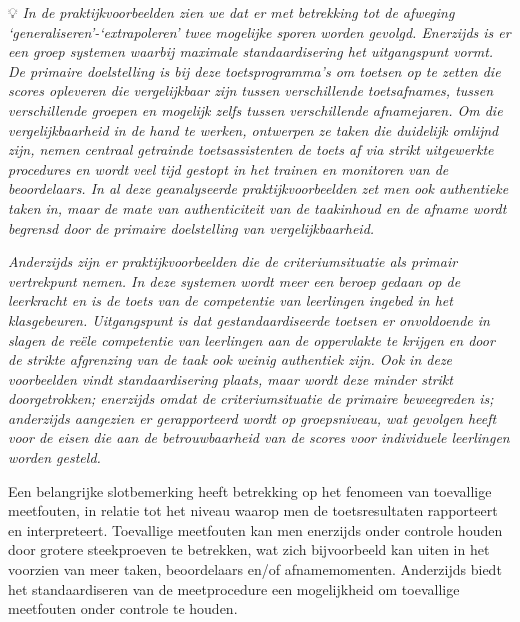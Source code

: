 \documentclass[
  letterpaper,
]{report}
\begin{document}
💡 \emph{In de praktijkvoorbeelden zien we dat er met betrekking tot de
afweging `generaliseren'-`extrapoleren' twee mogelijke sporen worden
gevolgd. Enerzijds is er een groep systemen waarbij maximale
standaardisering het uitgangspunt vormt. De primaire doelstelling is bij
deze toetsprogramma's om toetsen op te zetten die scores opleveren die
vergelijkbaar zijn tussen verschillende toetsafnames, tussen
verschillende groepen en mogelijk zelfs tussen verschillende
afnamejaren. Om die vergelijkbaarheid in de hand te werken, ontwerpen ze
taken die duidelijk omlijnd zijn, nemen centraal getrainde
toetsassistenten de toets af via strikt uitgewerkte procedures en wordt
veel tijd gestopt in het trainen en monitoren van de beoordelaars. In al
deze geanalyseerde praktijkvoorbeelden zet men ook authentieke taken in,
maar de mate van authenticiteit van de taakinhoud en de afname wordt
begrensd door de primaire doelstelling van vergelijkbaarheid.}

\emph{Anderzijds zijn er praktijkvoorbeelden die de criteriumsituatie
als primair vertrekpunt nemen. In deze systemen wordt meer een beroep
gedaan op de leerkracht en is de toets van de competentie van leerlingen
ingebed in het klasgebeuren. Uitgangspunt is dat gestandaardiseerde
toetsen er onvoldoende in slagen de reële competentie van leerlingen aan
de oppervlakte te krijgen en door de strikte afgrenzing van de taak ook
weinig authentiek zijn. Ook in deze voorbeelden vindt standaardisering
plaats, maar wordt deze minder strikt doorgetrokken; enerzijds omdat de
criteriumsituatie de primaire beweegreden is; anderzijds aangezien er
gerapporteerd wordt op groepsniveau, wat gevolgen heeft voor de eisen
die aan de betrouwbaarheid van de scores voor individuele leerlingen
worden gesteld.}

Een belangrijke slotbemerking heeft betrekking op het fenomeen van
toevallige meetfouten, in relatie tot het niveau waarop men de
toetsresultaten rapporteert en interpreteert. Toevallige meetfouten kan
men enerzijds onder controle houden door grotere steekproeven te
betrekken, wat zich bijvoorbeeld kan uiten in het voorzien van meer
taken, beoordelaars en/of afnamemomenten. Anderzijds biedt het
standaardiseren van de meetprocedure een mogelijkheid om toevallige
meetfouten onder controle te houden.
\end{document}
